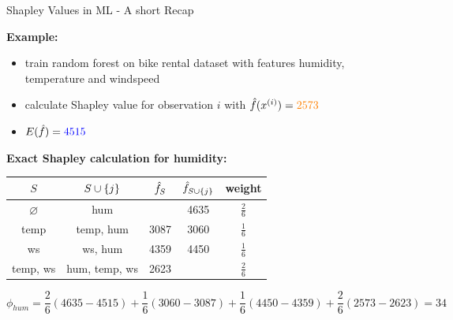 \documentclass[11pt,compress,t,notes=noshow, aspectratio=169, xcolor=table]{beamer}
\begin{document}
\begin{vbframe}{Shapley Values in ML - A short Recap}
  
  \textbf{Example:} 
  \begin{itemize}
      \item train random forest on bike rental dataset with features humidity, temperature and windspeed
      \item calculate Shapley value for observation $i$ with $\fh(x^{(i)}) = \color{orange}{2573}$
      \item $E(\fh) = \color{blue}{4515}$
  \end{itemize}
  \textbf{Exact Shapley calculation for humidity:} 
  \begin{table}[T]
      \centering
      \begin{tabular}{c|c|c|c|c}
   $S$    &  $\Scupj$  & $\fh_S$ &  $\fh_{\Scupj}$  & weight\\\hline
     $\varnothing$&    hum  & \color{blue}{4515} & 4635 & $\frac{2}{6}$\\
       temp &  temp, hum & 3087 & 3060& $\frac{1}{6}$\\
       ws &  ws, hum & 4359  & 4450 & $\frac{1}{6}$\\
       temp, ws &  hum, temp, ws & 2623 & \color{orange}{2573} & $\frac{2}{6}$
         
      \end{tabular}
      \label{tab:my_label}
  \end{table}

$$
\phi_{hum} = \frac{2}{6} (4635-4515) + \frac{1}{6} (3060-3087) + \frac{1}{6} (4450-4359) + \frac{2}{6} (2573-2623) = 34
$$

\end{vbframe}
\end{document}
